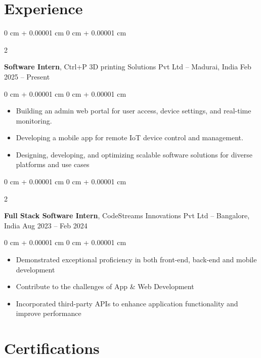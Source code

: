 \documentclass[10pt, letterpaper]{article}
\newenvironment{highlights}{
    \begin{itemize}[
        topsep=0.10 cm,
        parsep=0.10 cm,
        partopsep=0pt,
        itemsep=0pt,
        leftmargin=0 cm + 10pt
    ]
}{
    \end{itemize}
} %
\newenvironment{onecolentry}{
    \begin{adjustwidth}{
        0 cm + 0.00001 cm
    }{
        0 cm + 0.00001 cm
    }
}{
    \end{adjustwidth}
} %
\newenvironment{twocolentry}[2][]{
    \onecolentry
    \def\secondColumn{#2}
    \setcolumnwidth{\fill, 4.5 cm}
    \begin{paracol}{2}
}{
    \switchcolumn \raggedleft \secondColumn
    \end{paracol}
    \endonecolentry
} %
\begin{document}
    
    \section{Experience}

     \begin{twocolentry}{
            Feb 2025 – Present
        }
            \textbf{Software Intern}, Ctrl+P 3D printing Solutions Pvt Ltd – Madurai, India  \end{twocolentry}

        \vspace{0.10 cm}
        \begin{onecolentry}
            \begin{highlights}
                \item Building an admin web portal for user access, device settings, and real-time monitoring.  
                \item Developing a mobile app for remote IoT device control and management. 
                \item  Designing, developing, and optimizing scalable software solutions for diverse platforms and use cases 
            \end{highlights}
        \end{onecolentry}

        \vspace{0.4 cm}
        
        \begin{twocolentry}{
            Aug 2023 – Feb 2024
        }
            \textbf{Full Stack Software Intern}, CodeStreams Innovations Pvt Ltd – Bangalore, India  \end{twocolentry}

        \vspace{0.10 cm}
        \begin{onecolentry}
            \begin{highlights}
                \item Demonstrated exceptional proficiency in both front-end, back-end and mobile development 
                \item Contribute to the challenges of App \& Web Development 
                \item Incorporated third-party APIs to enhance application functionality and improve performance 
            \end{highlights}
        \end{onecolentry}

         \section{Certifications}
       
\end{document}

